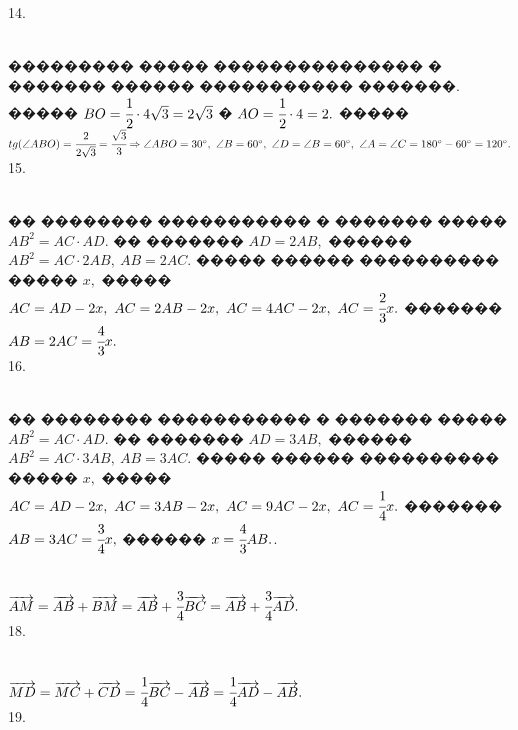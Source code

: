 \documentclass[12pt]{article}
\begin{document}
14. \begin{figure}[ht!]
\end{figure}\\
��������� ����� ��������������� � ������� ������ ����������� �������. ����� $BO=\cfrac{1}{2}\cdot4\sqrt{3}=2\sqrt{3}$ � $AO=\cfrac{1}{2}\cdot4=2.$ ����� $tg(\angle ABO)=\cfrac{2}{2\sqrt{3}}=\cfrac{\sqrt{3}}{3}\Rightarrow \angle ABO =30^\circ,\ \angle B=60^\circ,\ \angle D=\angle B=60^\circ,\ \angle A=\angle C=180^\circ-60^\circ=120^\circ.$\\
15. \begin{figure}[ht!]
\end{figure}\\
�� �������� ����������� � ������� ����� $AB^2=AC\cdot AD.$ �� ������� $AD=2AB,$ ������ $AB^2=AC\cdot2AB,\ AB=2AC.$ ����� ������ ���������� ����� $x,$ ����� $AC=AD-2x,\ AC=2AB-2x,\ AC=4AC-2x,\ AC=\cfrac{2}{3}x.$ ������� $AB=2AC=\cfrac{4}{3}x.$\\
16. \begin{figure}[ht!]
\end{figure}\\
�� �������� ����������� � ������� ����� $AB^2=AC\cdot AD.$ �� ������� $AD=3AB,$ ������ $AB^2=AC\cdot3AB,\ AB=3AC.$ ����� ������ ���������� ����� $x,$ ����� $AC=AD-2x,\ AC=3AB-2x,\ AC=9AC-2x,\ AC=\cfrac{1}{4}x.$ ������� $AB=3AC=\cfrac{3}{4}x,$ ������ $x=\cfrac{4}{3}AB.$\newpage{}. \begin{figure}[ht!]
\end{figure}\\
$\overrightarrow{AM}=\overrightarrow{AB}+\overrightarrow{BM}=\overrightarrow{AB}+\cfrac{3}{4}\overrightarrow{BC}=
\overrightarrow{AB}+\cfrac{3}{4}\overrightarrow{AD}.$\\
18. \begin{figure}[ht!]
\end{figure}\\
$\overrightarrow{MD}=\overrightarrow{MC}+\overrightarrow{CD}=\cfrac{1}{4}\overrightarrow{BC}-\overrightarrow{AB}=
\cfrac{1}{4}\overrightarrow{AD}-\overrightarrow{AB}.$\\
19. \begin{figure}[ht!]
\end{figure}\\
\end{document}
